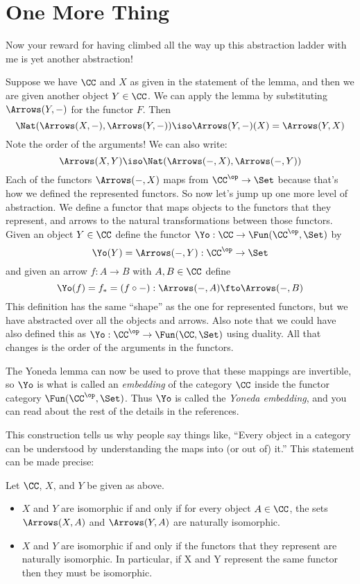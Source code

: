 \section{One More Thing}

Now your reward for having climbed all the way up this abstraction ladder with me is yet
another abstraction!

Suppose we have $\CC$ and $X$ as given in the statement of the lemma, and then we are given another object $Y \in \CC$. 
We can apply the lemma by substituting
$\Arrows(Y,-)$ for the functor $F$. Then
$$
\Nat(\Arrows(X, -),\Arrows(Y,-)) \iso \Arrows(Y,-)(X) = \Arrows(Y,X)
$$
Note the order of the arguments! We can also write:
$$
\Arrows(X,Y) \iso \Nat(\Arrows(-, X),\Arrows(-,Y))
$$
Each of the functors $\Arrows(-, X)$ maps from $\CC^\op \to \Set$ because that's how we
defined the represented functors. So now let's jump up one more level of abstraction. We
define a functor that maps objects to the functors that they represent, and arrows to the
natural transformations between those functors. Given an object $Y\in\CC$ define the functor
$\Yo:\CC \to \Fun(\CC^\op, \Set)$ by
$$
\Yo(Y) = \Arrows(-, Y) : \CC^\op \to \Set
$$
and given an arrow $f: A \to B$ with $A,B \in \CC$ define
$$
\Yo(f) = f_* = (f \circ -) : \Arrows(-,A) \fto \Arrows(-,B)
$$
This definition has the same ``shape'' as the one for represented functors, but we have
abstracted over all the objects and arrows. Also note that we could have also defined this
as $\Yo:\CC^\op \to \Fun(\CC, \Set)$ using duality. All that changes is the 
order of the arguments in the functors.

The Yoneda lemma can now be used to prove that these mappings are invertible, so
$\Yo$ is what is called an {\it embedding} of the category $\CC$ inside the functor
category $\Fun(\CC^\op, \Set)$. Thus $\Yo$ is called the {\it Yoneda embedding}, and you
can read about the rest of the details in the references.

This construction tells us why people say things like, ``Every object in a category can be
understood by understanding the maps into (or out of) it.''  This statement can be made precise:
\begin{cor}
Let $\CC$, $X$, and $Y$ be given as above.
\begin{itemize}
\item $X$  and $Y$ are isomorphic if and only if for every object $A \in \CC$, the sets
$\Arrows(X, A)$ and $\Arrows(Y, A)$ are naturally isomorphic.
\item $X$ and $Y$ are isomorphic if and only if the functors that they represent are
naturally isomorphic. In particular, if X and Y represent the same functor then they must
be isomorphic.
\end{itemize}
\end{cor}

